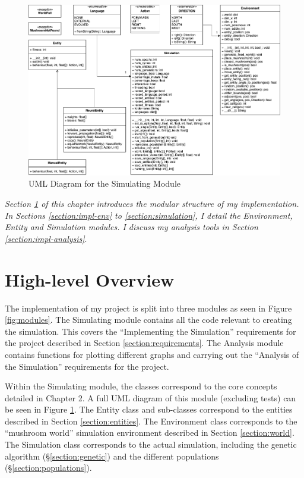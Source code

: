 \documentclass[12pt,a4paper]{report}
\begin{document}
\begin{figure}[t]
  \centering
  \includegraphics[width=1.\linewidth]{figs/uml}
  \caption{UML Diagram for the Simulating Module}
  \label{fig:uml}
\end{figure}


\emph{Section \ref{section:impl-high} of this chapter introduces the modular structure of my implementation. In Sections \ref{section:impl-env} to \ref{section:simulation}, I detail the Environment, Entity and Simulation modules. I discuss my analysis tools in Section \ref{section:impl-analysis}}.

\section{High-level Overview}\label{section:impl-high}

The implementation of my project is split into three modules as seen in Figure \ref{fig:modules}. The Simulating module contains all the code relevant to creating the simulation. This covers the ``Implementing the Simulation'' requirements for the project described in Section \ref{section:requirements}. The Analysis module contains functions for plotting different graphs and carrying out the ``Analysis of the Simulation'' requirements for the project.

Within the Simulating module, the classes correspond to the core concepts detailed in Chapter 2. A full UML diagram of this module (excluding tests) can be seen in Figure \ref{fig:uml}. The Entity class and sub-classes correspond to the entities described in Section \ref{section:entities}. The Environment class corresponds to the ``mushroom world'' simulation environment described in Section \ref{section:world}. The Simulation class corresponds to the actual simulation, including the genetic algorithm (\S\ref{section:genetic}) and the different populations (\S\ref{section:populations}).
\end{document}
